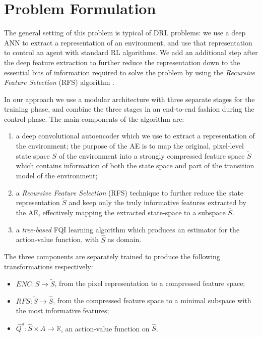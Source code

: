 \section{Problem Formulation}
The general setting of this problem is typical of DRL problems: we use a deep 
ANN to extract a representation of an environment, and use that representation 
to control an agent with standard RL algorithms. We add an additional step after
the deep feature extraction to further reduce the representation down to the 
essential bits of information required to solve the problem by using the 
\textit{Recursive Feature Selection} (RFS) algorithm \cite{castelletti2011tree}.

In our approach we use a modular architecture with three separate stages for the
training phase, and combine the three stages in an end-to-end fashion during
the control phase. The main components of the algorithm are:
%
\begin{enumerate}
    \item a deep convolutional autoencoder which we use to extract a 
    representation of the environment;
    the purpose of the AE is to map the original, pixel-level state space $S$ of
    the environment into a strongly compressed feature space ${\tilde{S}}$ which
    contains information of both the state space and part of the transition 
    model of the environment;
    \item a \textit{Recursive Feature Selection} (RFS) technique to further 
    reduce the state representation $\tilde{S}$ and keep only the truly 
    informative features extracted by the AE, effectively mapping the extracted 
    state-space to a subspace $\hat{S}$.
    \item a \textit{tree-based} FQI learning algorithm which produces an 
    estimator for the action-value function, with $\hat{S}$ as domain. 
\end{enumerate}
%
The three components are separately trained to produce the following 
transformations respectively:
\begin{itemize}
    \item $ENC: S \rightarrow \tilde{S}$, from the pixel representation to a 
    compressed feature space;
    \item $RFS: \tilde{S} \rightarrow \hat{S}$, from the compressed feature space
    to a minimal subspace with the most informative features;
    \item $\hat{Q}^\pi: \hat{S} \times A \rightarrow \mathbb{R}$, an 
    action-value function on $\hat{S}$.
\end{itemize}

